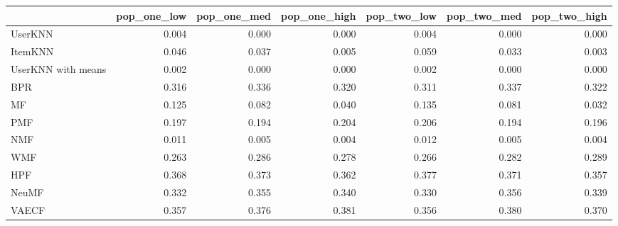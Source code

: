 \begin{tabular}{lrrrrrr}
\toprule
{} &  pop\_one\_low &  pop\_one\_med &  pop\_one\_high &  pop\_two\_low &  pop\_two\_med &  pop\_two\_high \\
\midrule
UserKNN            &        0.004 &        0.000 &         0.000 &        0.004 &        0.000 &         0.000 \\
ItemKNN            &        0.046 &        0.037 &         0.005 &        0.059 &        0.033 &         0.003 \\
UserKNN with means &        0.002 &        0.000 &         0.000 &        0.002 &        0.000 &         0.000 \\
BPR                &        0.316 &        0.336 &         0.320 &        0.311 &        0.337 &         0.322 \\
MF                 &        0.125 &        0.082 &         0.040 &        0.135 &        0.081 &         0.032 \\
PMF                &        0.197 &        0.194 &         0.204 &        0.206 &        0.194 &         0.196 \\
NMF                &        0.011 &        0.005 &         0.004 &        0.012 &        0.005 &         0.004 \\
WMF                &        0.263 &        0.286 &         0.278 &        0.266 &        0.282 &         0.289 \\
HPF                &        0.368 &        0.373 &         0.362 &        0.377 &        0.371 &         0.357 \\
NeuMF              &        0.332 &        0.355 &         0.340 &        0.330 &        0.356 &         0.339 \\
VAECF              &        0.357 &        0.376 &         0.381 &        0.356 &        0.380 &         0.370 \\
\bottomrule
\end{tabular}
